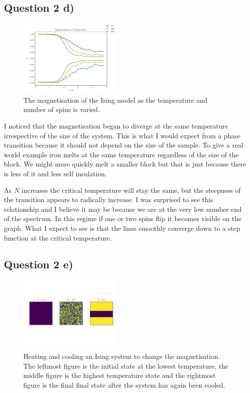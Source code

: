 \documentclass[a4paper, twocolumn]{article}
\begin{document}
\subsection*{Question 2 d)}
\begin{figure}
    \centering
    \includegraphics[width=0.45\textwidth]{pub/figures/magnetisation_ising_2d.pdf}
    \caption{The magnetisation of the Ising model as the %
        temperature and number of spins is varied.}
    \label{fig:8}
\end{figure}


I noticed that the magnetisation began to diverge at the same %
temperature irrespective of the size of the system. This is what %
I would expect from a phase transition because it should not depend %
on the size of the sample. To give a real world example iron melts %
at the same temperature regardless of the size of the block. %
We might more quickly melt a smaller block but that is just because %
there is less of it and less self insulation. 


As \(N\) increases the critical temperature will stay the same, %
but the steepness of the transition appears to radically increase. %
I was surprised to see this relationship and I believe it may %
be because we are at the very low number end of the spectrum. %
In this regime if one or two spins flip it becomes visible on %
the graph. What I expect to see is that the lines smoothly %
converge down to a step function at the critical temperature. 


\subsection*{Question 2 e)}
\begin{figure}
    \centering
    \includegraphics[width=0.45\textwidth]{pub/figures/heating_and_cooling_ising_2d.pdf}
    \caption{Heating and cooling an Ising system to change the %
        magnetisation. The leftmost figure is the initial state %
        at the lowest temperature, the middle figure is the highest %
        temperature state and the rightmost figure is the final %
        final state after the system has again been cooled.}
    \label{fig:9}
\end{figure}
\end{document}
